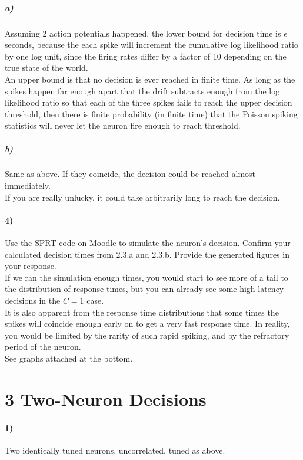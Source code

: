 \documentclass[10pt,letter]{article}
\begin{document}
\subparagraph{a)} Assuming 2 action potentials happened, the lower bound for decision time is 
$\epsilon$ seconds, because the each spike will increment the cumulative log likelihood ratio by 
one log unit, since the firing rates differ by a factor of 10 depending on the true state of the world.\\

An upper bound is that no decision is ever reached in finite time. As long as the spikes happen far 
enough apart that the drift subtracts enough from the log likelihood ratio so that each of the three 
spikes fails to reach the upper decision threshold, then there is finite probability (in finite time) that the Poisson spiking statistics will never let the neuron fire enough to reach threshold.

\subparagraph{b)} Same as above. If they coincide, the decision could be reached almost immediately.\\

If you are really unlucky, it could take arbitrarily long to reach the decision.

\paragraph{4)} Use the SPRT code on Moodle to simulate the neuron’s decision. Confirm your calculated
decision times from 2.3.a and 2.3.b. Provide the generated figures in your
response.\\

If we ran the simulation enough times, you would start to see more of a tail to the distribution of 
response times, but you can already see some high latency decisions in the $C = 1$ case.\\

It is also apparent from the response time distributions that some times the spikes will coincide 
enough early on to get a very fast response time.  In reality, you would be limited by the rarity 
of such rapid spiking, and by the refractory period of the neuron.\\

See graphs attached at the bottom.

\section*{3 Two-Neuron Decisions}

\paragraph{1)} Two identically tuned neurons, uncorrelated, tuned as above.\\
\end{document}
